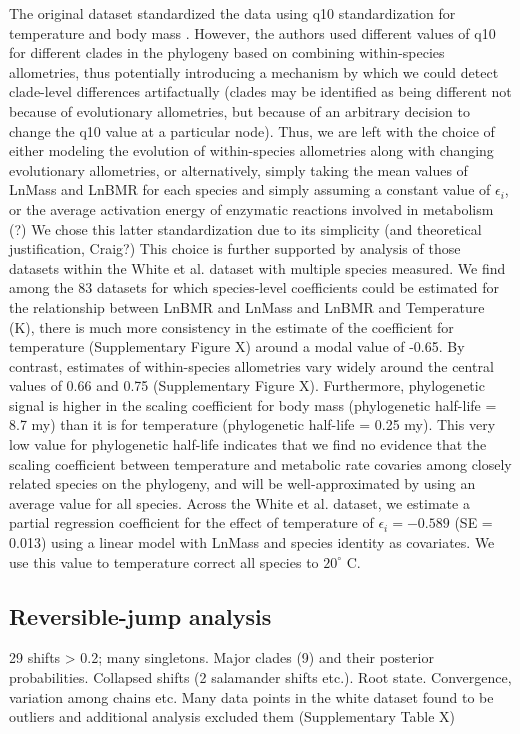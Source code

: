 \documentclass[a4paper,11pt]{article}
\begin{document}
The original \citet{White} dataset standardized the data using q10 standardization for temperature and body mass \citep{xxx}. However, the authors used different values of q10 for different clades in the phylogeny based on combining within-species allometries, thus potentially introducing a mechanism by which we could detect clade-level differences artifactually (clades may be identified as being different not because of evolutionary allometries, but because of an arbitrary decision to change the q10 value at a particular node). Thus, we are left with the choice of either modeling the evolution of within-species allometries along with changing evolutionary allometries, or alternatively, simply taking the mean values of LnMass and LnBMR for each species and simply assuming a constant value of $\epsilon_i$, or the average activation energy of enzymatic reactions involved in metabolism (?) We chose this latter standardization due to its simplicity (and theoretical justification, Craig?) This choice is further supported by analysis of those datasets within the White et al. dataset with multiple species measured. We find among the 83 datasets for which species-level coefficients could be estimated for the relationship between LnBMR and LnMass and LnBMR and Temperature (K), there is much more consistency in the estimate of the coefficient for temperature (Supplementary Figure X) around a modal value of -0.65. By contrast, estimates of within-species allometries vary widely around the central values of 0.66 and 0.75 (Supplementary Figure X). Furthermore, phylogenetic signal is higher in the scaling coefficient for body mass (phylogenetic half-life = 8.7 my) than it is for temperature (phylogenetic half-life = 0.25 my). This very low value for phylogenetic half-life \citep{Hansen2008} indicates that we find no evidence that the scaling coefficient between temperature and metabolic rate covaries among closely related species on the phylogeny, and will be well-approximated by using an average value for all species. Across the White et al. dataset, we estimate a partial regression coefficient for the effect of temperature of $\epsilon_i = -0.589$ (SE = 0.013) using a linear model with LnMass and species identity as covariates. We use this value to temperature correct all species to $20^\circ$ C. 

\subsection*{Reversible-jump analysis}
29 shifts > 0.2; many singletons. Major clades (9) and their posterior probabilities. Collapsed shifts (2 salamander shifts etc.). Root state. Convergence, variation among chains etc. Many data points in the white dataset found to be outliers and additional analysis excluded them (Supplementary Table X)\\
\end{document}
